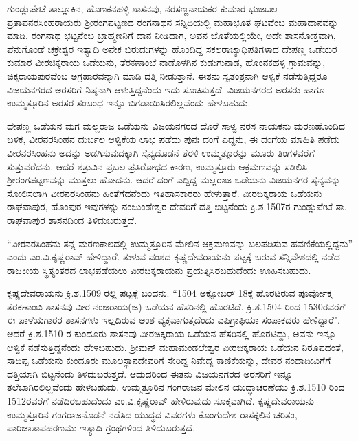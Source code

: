 ಗುಂಡ್ಲುಪೇಟೆ ತಾಲ್ಲೂಕಿನ, ಹೊಣಕನಹಳ್ಳಿ ಶಾಸನವು, ನರಸಣ್ಣನಾಯಕರ ಕುಮಾರ ಭುಜಬಲ ಪ್ರತಾಪ\break ನರಸಿಂಹರಾಯರು ಶ‍್ರೀರಂಗಪಟ್ಟಣದ ರಂಗನಾಥನ ಸನ್ನಿಧಿಯಲ್ಲಿ ಮಹಾಭೂತ ಘಟವೆಂಬ ಮಹಾದಾನವನ್ನು ಮಾಡಿ, ರಂಗನಾಥ ಭಟ್ಟನೆಂಬ ಬ್ರಾಹ್ಮಣನಿಗೆ ದಾನ ನೀಡಿದಾಗ, ಅವನ ಜೊತೆಯಲ್ಲಿಯೇ, ಅದೇ ಶಾಸನೋಕ್ತವಾಗಿ, ಪೆನುಗೊಂಡೆ ಚಕ್ರೇಶ್ವರ ಇತ್ಯಾದಿ ಅನೇಕ ಬಿರುದುಗಳನ್ನು ಹೊಂದಿದ್ದ ಸಕಲರಾಜ್ಯಾಧಿಪತಿಗಳಾದ ದೇಪಣ್ಣ ಒಡೆಯರ ಕುಮಾರ ವೀರಚಿಕ್ಕರಾಯ ಒಡೆಯನು, ತೆರಕಣಾಂಬೆ ನಾಡೊಳಗಿನ ಕುಡುಗುನಾಡ, ಹೊಂನಕಹಳ್ಳಿ ಗ್ರಾಮವನ್ನು, ಚಿಕ್ಕರಾಯಪುರವೆಂಬ ಅಗ್ರಹಾರವನ್ನಾಗಿ ಮಾಡಿ ದತ್ತಿ ನೀಡುತ್ತಾನೆ. ಈತನು ಸ್ವತಂತ್ರನಾಗಿ ಆಳ್ವಿಕೆ ನಡೆಸುತ್ತಿದ್ದರೂ ವಿಜಯನಗರದ ಅರಸರಿಗೆ ನಿಷ್ಠನಾಗಿ ಆಳುತ್ತಿದ್ದನೆಂದು ಇದು ಸೂಚಿಸುತ್ತದೆ. ವಿಜಯನಗರದ ಅರಸರು ಹಾಗೂ ಉಮ್ಮತ್ತೂರಿನ ಅರಸರ ಸಂಬಂಧ ಇನ್ನೂ ಬಿಗಡಾಯಿಸಿರಲಿಲ್ಲವೆಂದು ಹೇಳಬಹುದು.

ದೇಪಣ್ಣ ಒಡೆಯನ ಮಗ ಮಲ್ಲರಾಜ ಒಡೆಯನು ವಿಜಯನಗರದ ದೊರೆ ಸಾಳ್ವ ನರಸ ನಾಯಕನು ಮರಣಹೊಂದಿದ ಬಳಿಕ, ವೀರನರಸಿಂಹನ ದುರ್ಬಲ ಆಳ್ವಿಕೆಯ ಲಾಭ ಪಡೆದು ಪುನಃ ದಂಗೆ ಎದ್ದನು, ಈ ದಂಗೆಯ ಮಾಹಿತಿ ಪಡೆದು ವೀರನರಸಿಂಹನು ಅದನ್ನು ಅಡಗಿಸುವುದಕ್ಕಾಗಿ ಸೈನ್ಯದೊಡನೆ ತೆರಳಿ ಉಮ್ಮತ್ತೂರನ್ನು ಮೂರು ತಿಂಗಳವರೆಗೆ ಸುತ್ತುವರೆದನು. ಆದರೆ ಶತ್ರುವಿನ ಪ್ರಬಲ ಪ್ರತಿರೋಧದ ಕಾರಣ, ಉಮ್ಮತ್ತೂರು ಆಕ್ರಮಣವನ್ನು ಸಡಿಲಿಸಿ ಶ‍್ರೀರಂಗಪಟ್ಟಣವನ್ನು ಮುತ್ತಲು ಹೋದನು. ಆದರೆ ದಂಗೆ ಎದ್ದಿದ್ದ ಮಲ್ಲರಾಜ ಒಡೆಯನು ವಿಜಯನಗರ ಸೈನ್ಯವನ್ನು ಸೋಲಿಸಲಾಗಿ ವೀರನರಸಿಂಹನು ಹಿಂತೆಗೆದನೆಂದು ಇತಿಹಾಸಕಾರರು ಹೇಳುತ್ತಾರೆ. ವೀರಚಿಕ್ಕರಾಯ ಒಡೆಯನು ರಾಘವಾಪುರ, ಹೊಂಪುರ ಇವುಗಳನ್ನು ನಂಜುಂಡೇಶ್ವರ ದೇವರಿಗೆ ದತ್ತಿ ಬಿಟ್ಟನೆಂದು ಕ್ರಿ.ಶ.1507ರ ಗುಂಡ್ಲುಪೇಟೆ ತಾ. ರಾಘವಾಪುರ ಶಾಸನದಿಂದ ತಿಳಿದುಬರುತ್ತದೆ.

“ವೀರನರಸಿಂಹನು ತನ್ನ ಮರಣಕಾಲದಲ್ಲಿ ಉಮ್ಮತ್ತೂರಿನ ಮೇಲಿನ ಆಕ್ರಮಣವನ್ನು ಬಲಪಡಿಸುವ ಹವಣಿಕೆ\-ಯಲ್ಲಿದ್ದನು” ಎಂದು ಎಂ.ವಿ.ಕೃಷ್ಣರಾವ್​ ಹೇಳಿದ್ದಾರೆ. ತುಳುವ ವಂಶದ ಕೃಷ್ಣದೇವರಾಯನು ಪಟ್ಟಕ್ಕೆ ಬರುವ ಸನ್ನಿವೇಶದಲ್ಲಿ ನಡೆದ ರಾಜಕೀಯ ಸ್ಥಿತ್ಯಂತರದ ಲಾಭಪಡೆಯಲು ವೀರಚಿಕ್ಕರಾಯನು ಪ್ರಯತ್ನಿಸಿರಬಹುದೆಂದು ಊಹಿಸಬಹುದು.

ಕೃಷ್ಣದೇವರಾಯನು ಕ್ರಿ.ಶ.1509 ರಲ್ಲಿ ಪಟ್ಟಕ್ಕೆ ಬಂದನು. “1504 ಅಕ್ಟೋಬರ್​ 18ಕ್ಕೆ ಹೊರಟಿರುವ ಪೂರ್ವೋಕ್ತ ತೆರಕಣಾಂಬಿ ಶಾಸನವು ವೀರ ನಂಜರಾಯ(ಜ) ಒಡೆಯನ ಹೆಸರಿನಲ್ಲಿ ಹೊರಟಿದೆ. ಕ್ರಿ.ಶ.1504 ರಿಂದ 1530ರವರೆಗೆ ಈ ಪಾಳೆಯಗಾರರ ಶಾಸನಗಳು ಇಲ್ಲದಿರುವ ಅಂಶ ವ್ಯಕ್ತವಾಗುತ್ತದೆಂದು ಎಪಿಗ್ರಾಫಿಯಾ ಸಂಪಾಕದರು ಹೇಳಿದ್ದಾರೆ". ಆದರೆ ಕ್ರಿ.ಶ.1510 ರ ಕುಂದೂರು ಶಾಸನವು ವೀರಚಿಕ್ಕರಾಯ ಒಡೆಯನ ಹೆಸರಿನಲ್ಲಿ ಹೊರಟಿದ್ದು, ಅವನು ಇನ್ನೂ ಆಳ್ವಿಕೆ ನಡೆಸುತ್ತಿದ್ದನೆಂದು ಹೇಳಬಹುದು. ಶ‍್ರೀಮನ್​ ಮಹಾಮಂಡಲೇಶ್ವರ ವೀರಚಿಕ್ಕರಾಯ ಒಡೆಯನ ನಿರೂಪದಂತೆ, ಸಾದಿಪ್ಪ ಒಡೆಯನು ಕುಂದೂರು ಮೂಲಸ್ಥಾನದೇವರಿಗೆ ಸೇರಿದ್ದ ನಿವೇದ್ಯ ಕಾಣಿಕೆಯನ್ನು, ದೇವರ ನಂದಾದೀವಿಗೆಗೆ ದತ್ತಿಯಾಗಿ ಬಿಟ್ಟನೆಂದು ತಿಳಿದುಬರುತ್ತದೆ. ಆದುದರಿಂದ ಈತನು ವಿಜಯನಗರದ ಅರಸರಿಗೆ ಇನ್ನೂ ತಲೆಬಾಗಿರಲಿಲ್ಲವೆಂದು ಹೇಳ\-ಬಹುದು. ಉಮ್ಮತ್ತೂರಿನ ಗಂಗರಾಜನ ಮೇಲಿನ ಯುದ್ಧಾಚರಣೆಯು ಕ್ರಿ.ಶ.1510 ರಿಂದ 1512ರವರೆಗೆ ನಡೆದಿರಬಹುದೆಂದು ಎಂ.ವಿ.ಕೃಷ್ಣರಾವ್​ ಹೇಳಿರುವುದು ಸೂಕ್ತವಾಗಿದೆ. ಕೃಷ್ಣದೇವರಾಯನು ಉಮ್ಮತ್ತೂರಿನ ಗಂಗರಾಜನೊಡನೆ ನಡೆಸಿದ ಯುದ್ಧದ ವಿವರಗಳು ಕೊಂಗುದೇಶ ರಾಸಕ್ಕಲಿನ ಚರಿತಂ, ಪಾರಿಜಾತಾಪಹರಣಮು ಇತ್ಯಾದಿ ಗ್ರಂಥಗಳಿಂದ ತಿಳಿದುಬರುತ್ತದೆ.

